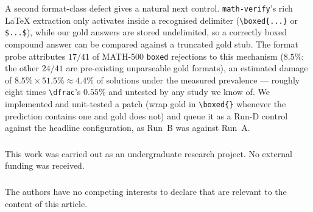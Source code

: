 \documentclass[runningheads]{llncs}
\begin{document}
A second format-class defect gives a natural next control. \texttt{math-verify}'s
rich \LaTeX{} extraction only activates inside a recognised delimiter
(\verb|\boxed{...}| or \verb|$...$|), while our gold answers are stored
undelimited, so a correctly boxed compound answer can be compared against a
truncated gold stub. The format probe attributes $17/41$ of MATH-500
\texttt{boxed} rejections to this mechanism ($8.5\%$; the other $24/41$ are
pre-existing unparseable gold formats), an estimated damage of $8.5\%\times51.5\%
\approx4.4\%$ of solutions under the measured prevalence --- roughly eight times
\verb|\dfrac|'s $0.55\%$ and untested by any study we know of. We implemented and
unit-tested a patch (wrap gold in \verb|\boxed{}| whenever the prediction contains
one and gold does not) and queue it as a Run-D control against the headline
configuration, as Run~B was against Run~A.

\begin{credits}
\subsubsection{\ackname}
This work was carried out as an undergraduate research project. No external
funding was received.

\subsubsection{\discintname}
The authors have no competing interests to declare that are relevant to the
content of this article.
\end{credits}
\end{document}
